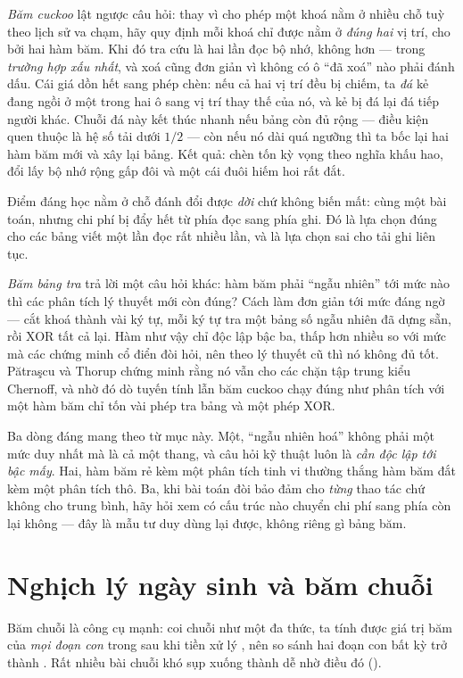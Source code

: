 \documentclass[../../algorithm.tex]{subfiles}
\begin{document}
\emph{Băm cuckoo}\cite{pagh2004} lật ngược câu hỏi: thay vì cho phép một khoá nằm ở nhiều chỗ tuỳ theo lịch sử va chạm, hãy quy định mỗi khoá chỉ được nằm ở \emph{đúng hai} vị trí, cho bởi hai hàm băm. Khi đó tra cứu là hai lần đọc bộ nhớ, không hơn ---  trong \emph{trường hợp xấu nhất}, và xoá cũng đơn giản vì không có ô ``đã xoá'' nào phải đánh dấu. Cái giá dồn hết sang phép chèn: nếu cả hai vị trí đều bị chiếm, ta \emph{đá} kẻ đang ngồi ở một trong hai ô sang vị trí thay thế của nó, và kẻ bị đá lại đá tiếp người khác. Chuỗi đá này kết thúc nhanh nếu bảng còn đủ rộng --- điều kiện quen thuộc là hệ số tải dưới \(1/2\) --- còn nếu nó dài quá ngưỡng thì ta bốc lại hai hàm băm mới và xây lại bảng. Kết quả: chèn tốn  kỳ vọng theo nghĩa khấu hao, đổi lấy bộ nhớ rộng gấp đôi và một cái đuôi hiếm hoi rất đắt.

Điểm đáng học nằm ở chỗ đánh đổi được \emph{dời} chứ không biến mất: cùng một bài toán, nhưng chi phí bị đẩy hết từ phía đọc sang phía ghi. Đó là lựa chọn đúng cho các bảng viết một lần đọc rất nhiều lần, và là lựa chọn sai cho tải ghi liên tục.

\emph{Băm bảng tra}\cite{patrascu2012} trả lời một câu hỏi khác: hàm băm phải ``ngẫu nhiên'' tới mức nào thì các phân tích lý thuyết mới còn đúng? Cách làm đơn giản tới mức đáng ngờ --- cắt khoá thành vài ký tự, mỗi ký tự tra một bảng số ngẫu nhiên đã dựng sẵn, rồi XOR tất cả lại. Hàm như vậy chỉ độc lập bậc ba, thấp hơn nhiều so với mức mà các chứng minh cổ điển đòi hỏi, nên theo lý thuyết cũ thì nó không đủ tốt. Pătraşcu và Thorup chứng minh rằng nó vẫn cho các chặn tập trung kiểu Chernoff, và nhờ đó dò tuyến tính lẫn băm cuckoo chạy đúng như phân tích với một hàm băm chỉ tốn vài phép tra bảng và một phép XOR.

Ba dòng đáng mang theo từ mục này. Một, ``ngẫu nhiên hoá'' không phải một mức duy nhất mà là cả một thang, và câu hỏi kỹ thuật luôn là \emph{cần độc lập tới bậc mấy}. Hai, hàm băm rẻ kèm một phân tích tinh vi thường thắng hàm băm đắt kèm một phân tích thô. Ba, khi bài toán đòi bảo đảm cho \emph{từng} thao tác chứ không cho trung bình, hãy hỏi xem có cấu trúc nào chuyển chi phí sang phía còn lại không --- đây là mẫu tư duy dùng lại được, không riêng gì bảng băm.

\section{Nghịch lý ngày sinh và băm chuỗi}

Băm chuỗi là công cụ mạnh: coi chuỗi như một đa thức, ta tính được giá trị băm của \emph{mọi đoạn con} trong  sau khi tiền xử lý , nên so sánh hai đoạn con bất kỳ trở thành . Rất nhiều bài chuỗi khó sụp xuống thành dễ nhờ điều đó ().
\end{document}
